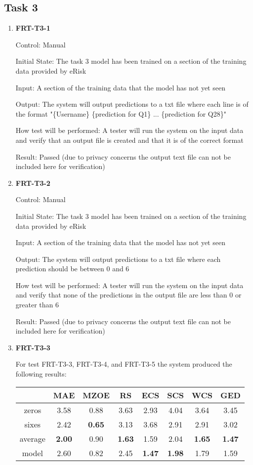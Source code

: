 \documentclass[12pt, titlepage]{article}
\begin{document}
 \subsection{Task 3}
 \begin{enumerate}
 
 \item \textbf{FRT-T3-1}

Control: Manual

Initial State: The task 3 model has been trained on a section of the training data provided by eRisk

Input: A section of the training data that the model has not yet seen

Output: The system will output predictions to a txt file where each line is of the format "\{Username\} \{prediction for Q1\} ... \{prediction for Q28\}"

How test will be performed: A tester will run the system on the input data and verify that an output file is created and that it is of the correct format

Result: Passed (due to privacy concerns the output text file can not be included here for verification)

\item \textbf{FRT-T3-2}

Control: Manual

Initial State: The task 3 model has been trained on a section of the training data provided by eRisk

Input: A section of the training data that the model has not yet seen

Output: The system will output predictions to a txt file where each prediction should be between 0 and 6

How test will be performed: A tester will run the system on the input data and verify that none of the predictions in the output file are less than 0 or greater than 6

Result: Passed (due to privacy concerns the output text file can not be included here for verification)

\item \textbf{FRT-T3-3}

For test FRT-T3-3, FRT-T3-4, and FRT-T3-5 the system produced the following results:

\begin{tabular}{c|ccccccc}
  &  MAE   & MZOE  & RS    & ECS   & SCS   & WCS   & GED \\ \hline
zeros  & 3.58  & 0.88  & 3.63  & 2.93  & 4.04  & 3.64  & 3.45 \\
sixes  & 2.42  & \textbf{0.65}  & 3.13  & 3.68  & 2.91  & 2.91  & 3.02 \\
average & \textbf{2.00}  & 0.90  & \textbf{1.63}  & 1.59  & 2.04  & \textbf{1.65}  & \textbf{1.47} \\
model  & 2.60  & 0.82  & 2.45  & \textbf{1.47}  & \textbf{1.98}  & 1.79  & 1.59 \\
\end{tabular}


\end{enumerate}
\end{document}
